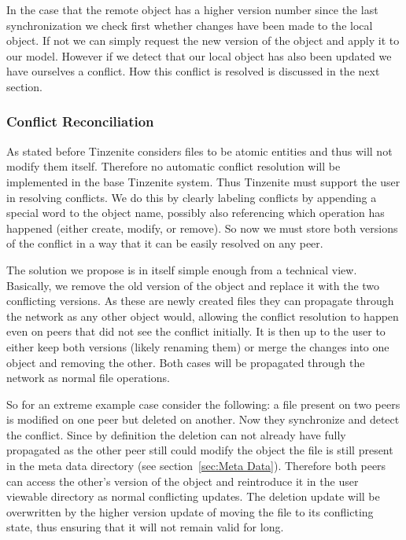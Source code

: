 In the case that the remote object has a higher version number since the last synchronization we check first whether changes have been made to the local object.
If not we can simply request the new version of the object and apply it to our model.
However if we detect that our local object has also been updated we have ourselves a conflict.
How this conflict is resolved is discussed in the next section.

\subsubsection{Conflict Reconciliation}
\label{subs:Conflict Reconciliation}

As stated before Tinzenite considers files to be atomic entities and thus will not modify them itself.
Therefore no automatic conflict resolution will be implemented in the base Tinzenite system.
Thus Tinzenite must support the user in resolving conflicts.
We do this by clearly labeling conflicts by appending a special word to the object name, possibly also referencing which operation has happened (either create, modify, or remove).
So now we must store both versions of the conflict in a way that it can be easily resolved on any peer.

The solution we propose is in itself simple enough from a technical view.
Basically, we remove the old version of the object and replace it with the two conflicting versions.
As these are newly created files they can propagate through the network as any other object would, allowing the conflict resolution to happen even on peers that did not see the conflict initially.
It is then up to the user to either keep both versions (likely renaming them) or merge the changes into one object and removing the other.
Both cases will be propagated through the network as normal file operations.

So for an extreme example case consider the following: a file present on two peers is modified on one peer but deleted on another.
Now they synchronize and detect the conflict.
Since by definition the deletion can not already have fully propagated as the other peer still could modify the object the file is still present in the meta data directory (see section~\ref{sec:Meta Data}).
Therefore both peers can access the other's version of the object and reintroduce it in the user viewable directory as normal conflicting updates.
The deletion update will be overwritten by the higher version update of moving the file to its conflicting state, thus ensuring that it will not remain valid for long.

